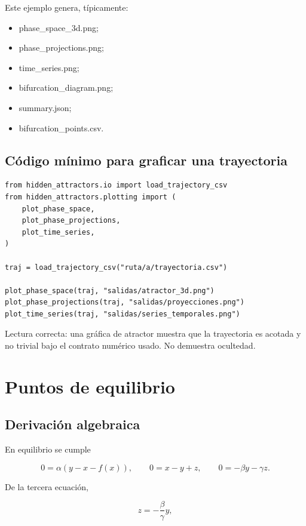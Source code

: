 \documentclass[11pt]{article}
\DeclareRobustCommand{\codepath}[1]{\begingroup\Urlmuskip=0mu plus 2mu\path{#1}\endgroup}
\def\codepath#1{#1}%
\begin{document}
Este ejemplo genera, típicamente:

\begin{itemize}
\item \codepath{phase_space_3d.png};
\item \codepath{phase_projections.png};
\item \codepath{time_series.png};
\item \codepath{bifurcation_diagram.png};
\item \codepath{summary.json};
\item \codepath{bifurcation_points.csv}.
\end{itemize}

\subsection{Código mínimo para graficar una trayectoria}

\begin{lstlisting}
from hidden_attractors.io import load_trajectory_csv
from hidden_attractors.plotting import (
    plot_phase_space,
    plot_phase_projections,
    plot_time_series,
)

traj = load_trajectory_csv("ruta/a/trayectoria.csv")

plot_phase_space(traj, "salidas/atractor_3d.png")
plot_phase_projections(traj, "salidas/proyecciones.png")
plot_time_series(traj, "salidas/series_temporales.png")
\end{lstlisting}

Lectura correcta: una gráfica de atractor muestra que la trayectoria es acotada y no trivial bajo el contrato numérico usado. No demuestra ocultedad.

\section{Puntos de equilibrio}

\subsection{Derivación algebraica}

En equilibrio se cumple

\begin{equation}
0=\alpha(y-x-f(x)),\qquad
0=x-y+z,\qquad
0=-\beta y-\gamma z.
\end{equation}

De la tercera ecuación,

\begin{equation}
z=-\frac{\beta}{\gamma}y,
\end{equation}
\end{document}
